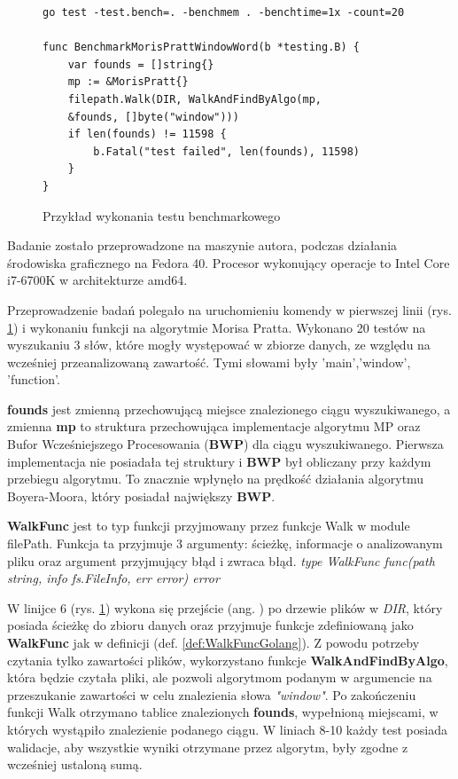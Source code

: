 \begin{figure}[h]
  \centering
  \begin{lstlisting}
go test -test.bench=. -benchmem . -benchtime=1x -count=20

func BenchmarkMorisPrattWindowWord(b *testing.B) {
	var founds = []string{}
	mp := &MorisPratt{}
	filepath.Walk(DIR, WalkAndFindByAlgo(mp,
    &founds, []byte("window")))
	if len(founds) != 11598 {
		b.Fatal("test failed", len(founds), 11598)
	}
}
  \end{lstlisting}
  \caption{Przykład wykonania testu benchmarkowego}
  \label{fig:code:examplePerfTest}
\end{figure}
Badanie zostało przeprowadzone na maszynie autora, podczas działania środowiska
graficznego na Fedora 40. Procesor wykonujący operacje to Intel Core i7-6700K
w architekturze amd64.

Przeprowadzenie badań polegało na uruchomieniu komendy w pierwszej linii (rys. 
\ref{fig:code:examplePerfTest}) i wykonaniu funkcji na algorytmie Morisa Pratta. 
Wykonano 20 testów na wyszukaniu 3 słów, które mogły występować w zbiorze danych,
ze względu na wcześniej przeanalizowaną zawartość. Tymi słowami były 
'main','window', 'function'.

\textbf{founds} jest zmienną przechowującą miejsce znalezionego 
ciągu wyszukiwanego, a zmienna \textbf{mp} to struktura przechowująca implementacje algorytmu MP oraz
Bufor Wcześniejszego Procesowania (\textbf{BWP}) dla ciągu wyszukiwanego. Pierwsza implementacja nie 
posiadała tej struktury i \textbf{BWP} był obliczany przy każdym przebiegu algorytmu.
 To znacznie wpłynęło na prędkość działania algorytmu Boyera-Moora, który posiadał największy \textbf{BWP}.

\begin{Definition}\label{def:WalkFuncGolang}
\textbf{WalkFunc} jest to typ funkcji przyjmowany przez funkcje Walk w module filePath.
Funkcja ta przyjmuje 3 argumenty: ścieżkę, informacje o analizowanym pliku oraz
argument przyjmujący błąd i zwraca błąd. \newline \newline
\textit{type WalkFunc func(path string, info fs.FileInfo, err error) error}
\end{Definition}

W linijce 6 (rys. \ref{fig:code:examplePerfTest}) wykona się przejście (ang. 
) po drzewie plików w \textit{DIR}, który posiada ścieżkę do 
zbioru danych oraz przyjmuje funkcje zdefiniowaną jako \textbf{WalkFunc} jak w definicji
(def. \ref{def:WalkFuncGolang}). Z powodu potrzeby czytania tylko zawartości plików,
wykorzystano funkcje \textbf{WalkAndFindByAlgo}, która będzie czytała pliki, ale 
pozwoli algorytmom podanym w argumencie na przeszukanie zawartości w celu 
znalezienia słowa \textit{"window"}. Po zakończeniu funkcji Walk otrzymano 
tablice znalezionych \textbf{founds}, wypełnioną miejscami, w których wystąpiło 
znalezienie podanego ciągu. W liniach 8-10 każdy test posiada walidacje, aby wszystkie wyniki 
otrzymane przez algorytm, były zgodne z wcześniej ustaloną sumą.

